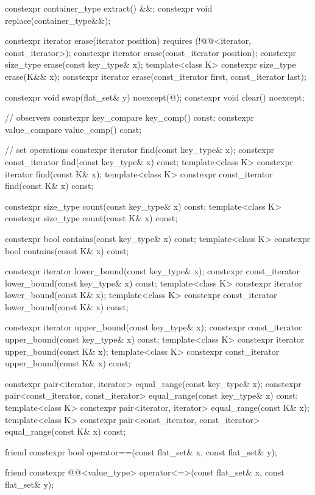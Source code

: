 \begin{codeblock}
{{    constexpr container_type extract() &&;
    constexpr void replace(container_type&&);

    constexpr iterator erase(iterator position) requires (!@@<iterator, const_iterator>);
    constexpr iterator erase(const_iterator position);
    constexpr size_type erase(const key_type& x);
    template<class K> constexpr size_type erase(K&& x);
    constexpr iterator erase(const_iterator first, const_iterator last);

    constexpr void swap(flat_set& y) noexcept(@\seebelow@);
    constexpr void clear() noexcept;

    // observers
    constexpr key_compare key_comp() const;
    constexpr value_compare value_comp() const;

    // set operations
    constexpr iterator find(const key_type& x);
    constexpr const_iterator find(const key_type& x) const;
    template<class K> constexpr iterator find(const K& x);
    template<class K> constexpr const_iterator find(const K& x) const;

    constexpr size_type count(const key_type& x) const;
    template<class K> constexpr size_type count(const K& x) const;

    constexpr bool contains(const key_type& x) const;
    template<class K> constexpr bool contains(const K& x) const;

    constexpr iterator lower_bound(const key_type& x);
    constexpr const_iterator lower_bound(const key_type& x) const;
    template<class K> constexpr iterator lower_bound(const K& x);
    template<class K> constexpr const_iterator lower_bound(const K& x) const;

    constexpr iterator upper_bound(const key_type& x);
    constexpr const_iterator upper_bound(const key_type& x) const;
    template<class K> constexpr iterator upper_bound(const K& x);
    template<class K> constexpr const_iterator upper_bound(const K& x) const;

    constexpr pair<iterator, iterator> equal_range(const key_type& x);
    constexpr pair<const_iterator, const_iterator> equal_range(const key_type& x) const;
    template<class K>
      constexpr pair<iterator, iterator> equal_range(const K& x);
    template<class K>
      constexpr pair<const_iterator, const_iterator> equal_range(const K& x) const;

    friend constexpr bool operator==(const flat_set& x, const flat_set& y);

    friend constexpr @@<value_type>
      operator<=>(const flat_set& x, const flat_set& y);

}}
\end{codeblock}
